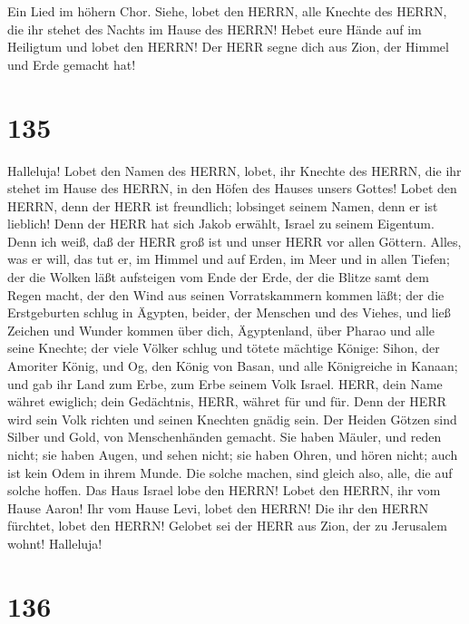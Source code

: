  Ein Lied im höhern Chor. Siehe, lobet den HERRN, alle
Knechte des HERRN, die ihr stehet des Nachts im Hause des HERRN!
 Hebet eure Hände auf im Heiligtum und lobet den HERRN!
 Der HERR segne dich aus Zion, der Himmel und Erde gemacht
hat!

\hypertarget{section-134}{%
\section{135}\label{section-134}}

 Halleluja! Lobet den Namen des HERRN, lobet, ihr Knechte
des HERRN,  die ihr stehet im Hause des HERRN, in den Höfen
des Hauses unsers Gottes!  Lobet den HERRN, denn der HERR
ist freundlich; lobsinget seinem Namen, denn er ist lieblich!
 Denn der HERR hat sich Jakob erwählt, Israel zu seinem
Eigentum.  Denn ich weiß, daß der HERR groß ist und unser
HERR vor allen Göttern.  Alles, was er will, das tut er, im
Himmel und auf Erden, im Meer und in allen Tiefen;  der die
Wolken läßt aufsteigen vom Ende der Erde, der die Blitze samt dem Regen
macht, der den Wind aus seinen Vorratskammern kommen läßt; 
der die Erstgeburten schlug in Ägypten, beider, der Menschen und des
Viehes,  und ließ Zeichen und Wunder kommen über dich,
Ägyptenland, über Pharao und alle seine Knechte;  der viele
Völker schlug und tötete mächtige Könige:  Sihon, der
Amoriter König, und Og, den König von Basan, und alle Königreiche in
Kanaan;  und gab ihr Land zum Erbe, zum Erbe seinem Volk
Israel.  HERR, dein Name währet ewiglich; dein Gedächtnis,
HERR, währet für und für.  Denn der HERR wird sein Volk
richten und seinen Knechten gnädig sein.  Der Heiden Götzen
sind Silber und Gold, von Menschenhänden gemacht.  Sie
haben Mäuler, und reden nicht; sie haben Augen, und sehen nicht;
 sie haben Ohren, und hören nicht; auch ist kein Odem in
ihrem Munde.  Die solche machen, sind gleich also, alle,
die auf solche hoffen.  Das Haus Israel lobe den HERRN!
Lobet den HERRN, ihr vom Hause Aaron!  Ihr vom Hause Levi,
lobet den HERRN! Die ihr den HERRN fürchtet, lobet den HERRN!
 Gelobet sei der HERR aus Zion, der zu Jerusalem wohnt!
Halleluja!

\hypertarget{section-135}{%
\section{136}\label{section-135}}

